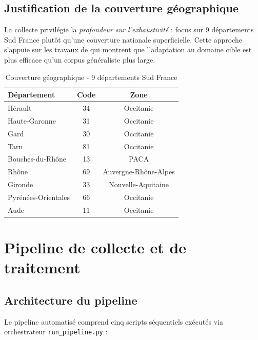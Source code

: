 \subsection{Justification de la couverture géographique}

La collecte privilégie la \textit{profondeur sur l'exhaustivité} : focus sur 9 départements Sud France plutôt qu'une couverture nationale superficielle. Cette approche s'appuie sur les travaux de \citet{gururangan2020dont} qui montrent que l'adaptation au domaine cible est plus efficace qu'un corpus généraliste plus large.

\begin{table}[h]
\centering
\caption{Couverture géographique - 9 départements Sud France}
\label{tab:geo_coverage}
\begin{tabular}{@{}lcc@{}}
\toprule
\textbf{Département} & \textbf{Code} & \textbf{Zone} \\
\midrule
Hérault & 34 & Occitanie \\
Haute-Garonne & 31 & Occitanie \\
Gard & 30 & Occitanie \\
Tarn & 81 & Occitanie \\
Bouches-du-Rhône & 13 & PACA \\
Rhône & 69 & Auvergne-Rhône-Alpes \\
Gironde & 33 & Nouvelle-Aquitaine \\
Pyrénées-Orientales & 66 & Occitanie \\
Aude & 11 & Occitanie \\
\bottomrule
\end{tabular}
\end{table}

\section{Pipeline de collecte et de traitement}

\subsection{Architecture du pipeline}

Le pipeline automatisé comprend cinq scripts séquentiels exécutés via orchestrateur \texttt{run\_pipeline.py} :

